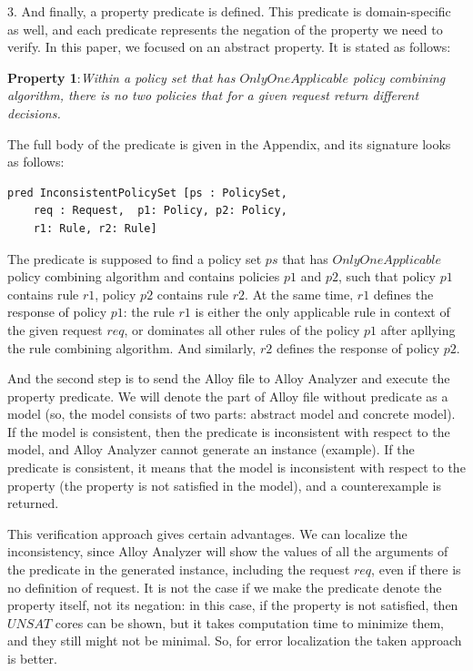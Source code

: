\documentclass{acm_proc_article-sp}
\begin{document}
3. And finally, a property predicate is defined. This predicate is domain-specific as well, and each predicate represents the negation of the property we need to verify. In this paper, we focused on an abstract property. It is stated as follows: 

\textbf{Property 1}:\textit{Within a policy set that has $OnlyOneApplicable$ policy combining algorithm, there is no two policies that for a given request return different decisions.}

The full body of the predicate is given in the Appendix, and its signature looks as follows:

\begin{verbatim}
pred InconsistentPolicySet [ps : PolicySet, 
    req : Request,  p1: Policy, p2: Policy, 
    r1: Rule, r2: Rule]
\end{verbatim}

The predicate is supposed to find a policy set $ps$ that has $OnlyOneApplicable$ policy combining algorithm and contains policies $p1$ and $p2$, such that policy $p1$ contains rule $r1$, policy $p2$ contains rule $r2$. At the same time, $r1$ defines the response of policy $p1$: the rule $ r1$ is either the only applicable rule in context of the given request $req$, or dominates all other rules of the policy $p1$ after apllying the rule combining algorithm. And similarly, $r2$ defines the response of policy $p2$.

And the second step is to send the Alloy file to Alloy Analyzer and execute the property predicate. We will denote the part of Alloy file without predicate as a model (so, the model consists of two parts: abstract model and concrete model). If the model is consistent, then the predicate is inconsistent with respect to the model, and Alloy Analyzer cannot generate an instance (example). If the predicate is consistent, it means that the model is inconsistent with respect to the property (the property is not satisfied in the model), and a counterexample is returned.

This verification approach gives certain advantages. We can localize the inconsistency, since Alloy Analyzer will show the values of all the arguments of the predicate in the generated instance, including the request $req$, even if there is no definition of request. It is not the case if we make the predicate denote the property itself, not its negation: in this case, if the property is not satisfied, then $UNSAT$ cores can be shown, but it takes computation time to minimize them, and they still might not be minimal. So, for error localization the taken approach is better.
\end{document}

